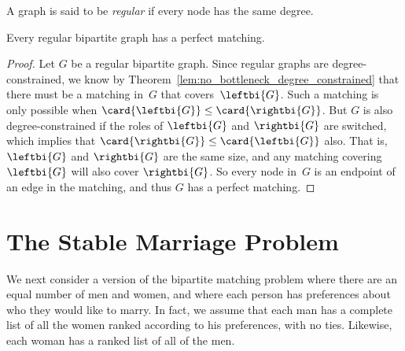 \begin{definition}\label{def:5P}
A graph is said to be \emph{regular} if every node has the same degree.
\end{definition}

\begin{theorem}\label{thm:5M}
Every regular bipartite graph has a perfect matching.
\end{theorem}

\begin{proof}
  Let $G$ be a regular bipartite graph.  Since regular graphs are
  degree-constrained, we know by
  Theorem~\ref{lem:no_bottleneck_degree_constrained} that there must
  be a matching in~$G$ that covers~$\leftbi{G}$.  Such a matching is
  only possible when $\card{\leftbi{G}} \leq \card{\rightbi{G}}$.  But
  $G$ is also degree-constrained if the roles of $\leftbi{G}$ and
  $\rightbi{G}$ are switched, which implies that $\card{\rightbi{G}}
  \leq \card{\leftbi{G}}$ also.  That is, $\leftbi{G}$ and
  $\rightbi{G}$ are the same size, and any matching covering
  $\leftbi{G}$ will also cover $\rightbi{G}$.  So every node in~$G$ is
  an endpoint of an edge in the matching, and thus $G$ has a perfect
  matching.
\end{proof}


\begin{problems}
\classproblems
{}

\examproblems
{}

\homeworkproblems
{}
\end{problems}


\section{The Stable Marriage Problem}
\label{stablemarriagesec}

We next consider a version of the bipartite matching problem where
there are an equal number of men and women, and where each person has
preferences about who they would like to marry.  In fact, we assume
that each man has a complete list of all the women ranked according
to his preferences, with no ties.  Likewise, each woman has a ranked
list of all of the men.

